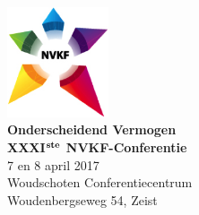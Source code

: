 \documentclass[a4paper,10pt]{report}
\begin{document}
\begin{multicols*}{3}

\noindent
\begin{center}
\includegraphics[width=3cm]{nvkf_logo}\\
{\bfseries Onderscheidend Vermogen}\\ \vspace{0.10cm} 
{\bfseries XXXI$^\textrm{\textbf{ste}}$ NVKF-Conferentie}\\ \vspace{0.10cm}
{7 en 8 april 2017}\\ \vspace{0.15cm}
{Woudschoten Conferentiecentrum}\\
{Woudenbergseweg 54, Zeist}
\end{center}
\vfill



\end{multicols*}
\end{document}
